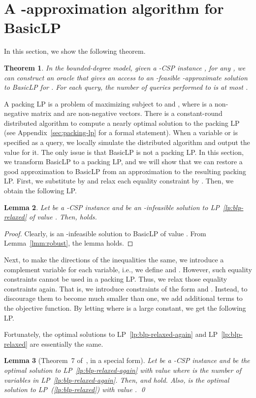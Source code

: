 \documentclass[letterpaper, 11pt]{article}
\newtheorem{theorem}{Theorem}[section]
\newtheorem{lemma}[theorem]{Lemma}
\newcommand{\blp}{\textsf{BasicLP}\xspace}
\begin{document}
\section{A -approximation algorithm for \blp}\label{sec:lp}
In this section, we show the following theorem.
\begin{theorem}\label{thr:lp}
  In the bounded-degree model, 
  given a -CSP instance ,
  for any ,
  we can construct an oracle  that gives an access to an -feasible -approximate solution to \blp for .
  For each query, the number of queries performed to  is at most .
\end{theorem}
A packing LP is a problem of maximizing  subject to  and ,
where  is a non-negative matrix and  are non-negative vectors.
There is a constant-round distributed algorithm to compute a nearly optimal solution to the packing LP (see Appendix~\ref{sec:packing-lp} for a formal statement).
When a variable  or  is specified as a query,
we locally simulate the distributed algorithm and output the value for it.
The only issue is that \blp is not a packing LP.
In this section, we transform \blp to a packing LP, 
and we will show that we can restore a good approximation to \blp from an approximation to the resulting packing LP.
First, we substitute  by  and relax each equality constraint by .
Then, we obtain the following LP.

\begin{lemma}
  Let  be a -CSP instance and  be an -infeasible solution to LP~\eqref{lp:blp-relaxed} of value .
  Then,  holds.
\end{lemma}
\begin{proof}
  Clearly,  is an -infeasible solution to \blp of value .
  From Lemma~\ref{lmm:robust},
  the lemma holds.
\end{proof}

Next, 
to make the directions of the inequalities the same,
we introduce a complement variable for each variable, i.e., we define  and .
However, such equality constraints cannot be used in a packing LP.
Thus, we relax those equality constraints again.
That is, we introduce constraints of the form  and .
Instead, to discourage them to become much smaller than one, 
we add additional terms to the objective function.
By letting  where  is a large constant, we get the following LP.


Fortunately, 
the optimal solutions to LP~\eqref{lp:blp-relaxed-again} and LP~\eqref{lp:blp-relaxed} are essentially the same.
\begin{lemma}[Theorem~7 of~\cite{FS97}, in a special form]\label{lmm:fs97}
  Let  be a -CSP instance and  be the optimal solution to LP~\eqref{lp:blp-relaxed-again} with value  where  is the number of variables in LP~\eqref{lp:blp-relaxed-again}.
  Then,  and  hold.
  Also,  is the optimal solution to LP~(\ref{lp:blp-relaxed}) with value .
  \qed
\end{lemma}
\end{document}
